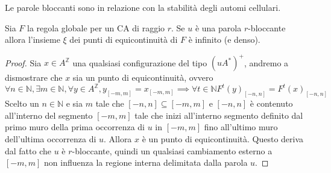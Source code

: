 Le parole bloccanti sono in relazione con la stabilità degli automi cellulari.
\begin{teorema}
    Sia $F$ la regola globale per un CA di raggio $r$. Se $u$ è una parola $r$-bloccante
    allora l'insieme $\xi$ dei punti di equicontinuità di $F$ è infinito (e denso).
    \begin{proof}
        Sia $x\in A^\mathbb{Z}$ una qualsiasi configurazione del tipo $(uA^\ast)^+$,
        andremo a dismostrare che $x$ sia un punto di equicontinuità, ovvero 
        $$\forall n\in \mathbb{N} ,\exists m\in \mathbb{N} , \forall y\in A^\mathbb{Z}, y_{[-m,m]} = x_{[-m,m]} \implies \forall t\in \mathbb{N} F^t(y)_{[-n,n]}=F^t(x)_{[-n,n]}$$
        Scelto un $n \in \mathbb{N}$ e sia $m$ tale che $[-n,n]\subseteq [-m,m]$
        e $[-n,n]$ è contenuto all'interno del segmento $[-m,m]$ tale che 
        inizi all'interno segmento definito dal primo muro della prima occorrenza di $u$ in $[-m,m]$ fino 
        all'ultimo muro dell'ultima occorrenza di $u$. Allora $x$ è un punto di 
        equicontinuità. Questo deriva dal fatto che $u$ è $r$-bloccante, quindi un
        qualsiasi cambiamento esterno a $[-m,m]$ non influenza la regione interna
        delimitata dalla parola $u$.
    \end{proof} 
\end{teorema}
